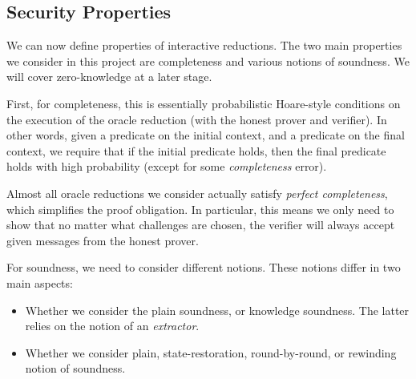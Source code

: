 

\subsection{Security Properties}\label{sec:security}

We can now define properties of interactive reductions. The two main properties we consider in this
project are completeness and various notions of soundness. We will cover zero-knowledge at a later
stage.

First, for completeness, this is essentially probabilistic Hoare-style conditions on the execution
of the oracle reduction (with the honest prover and verifier). In other words, given a predicate on
the initial context, and a predicate on the final context, we require that if the initial predicate
holds, then the final predicate holds with high probability (except for some \emph{completeness}
error).

\begin{definition}[Completeness]
    \label{def:completeness}
\end{definition}

Almost all oracle reductions we consider actually satisfy \emph{perfect completeness}, which
simplifies the proof obligation. In particular, this means we only need to show that no matter what challenges are chosen, the verifier will always accept given messages from the honest prover.

For soundness, we need to consider different notions. These notions differ in two main aspects:
\begin{itemize}
    \item Whether we consider the plain soundness, or knowledge soundness. The latter relies on the
    notion of an \emph{extractor}.
    \item Whether we consider plain, state-restoration, round-by-round, or rewinding notion of
    soundness.
\end{itemize}

